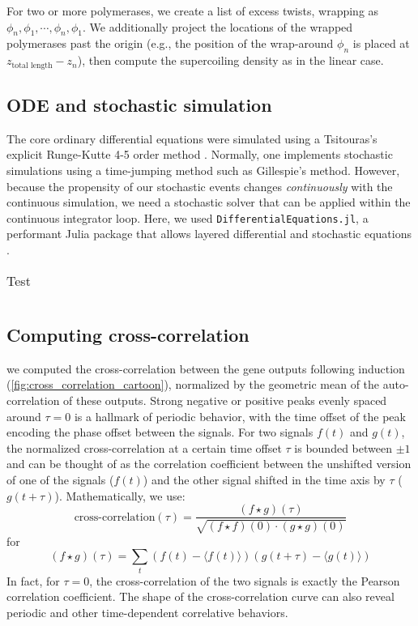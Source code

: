 \documentclass[11pt]{article}
\begin{document}
For two or more polymerases, we create a list of excess twists, wrapping as \(\phi_{n}, \phi_1, \cdots, \phi_n, \phi_1\). We additionally project the locations of the wrapped polymerases past the origin (e.g., the position of the wrap-around \(\phi_n\) is placed at \(z_\text{total length} - z_n\)), then compute the supercoiling density as in the linear case.

\subsection{ODE and stochastic simulation}
The core ordinary differential equations were simulated using a Tsitouras's explicit Runge-Kutte 4-5 order method \parencite{tsitourasRungeKuttaPairs2011}.
Normally, one implements stochastic simulations using a time-jumping method such as Gillespie's method. However, because the propensity of our stochastic events changes \emph{continuously} with the continuous simulation, we need a stochastic solver that can be applied within the continuous integrator loop. Here, we used \texttt{DifferentialEquations.jl}, a performant Julia package that allows layered differential and stochastic equations
\parencite{rackauckasDifferentialEquationsJlPerformant2017}.

\begin{table}[h]
\centering
\begin{tabular}{@{}ll@{}}
\end{tabular}
\caption{Test}
\end{table}

\subsection{Computing cross-correlation} \label{sec:supp:cross_correlation}
we computed the cross-correlation between the gene outputs following induction (\cref{fig:cross_correlation_cartoon}), normalized by the geometric mean of the auto-correlation of these outputs.  Strong negative or positive peaks evenly spaced around \(\tau = 0\) is a hallmark of periodic behavior, with the time offset of the peak encoding the phase offset between the signals. For two signals \(f(t)\) and \(g(t)\), the normalized cross-correlation at a certain time offset \(\tau\) is bounded between \(\pm1\) and can be thought of as the correlation coefficient between the unshifted version of one of the signals (\(f(t)\)) and the other signal shifted in the time axis by \(\tau\) (\(g(t + \tau)\)). Mathematically, we use:
\begin{equation}
\text{cross-correlation}(\tau) = \frac{(f \star g)(\tau)}{\sqrt{(f \star f)(0) \cdot (g \star g)(0)}}
\end{equation}
for
\begin{equation}
    (f \star g)(\tau) = \sum_t (f(t) - \langle f(t)\rangle)(g(t+\tau) - \langle g(t)\rangle)
\end{equation}
In fact, for \(\tau = 0\), the cross-correlation of the two signals is exactly the Pearson correlation coefficient. The shape of the cross-correlation curve can also reveal periodic and other time-dependent correlative behaviors.
\end{document}
